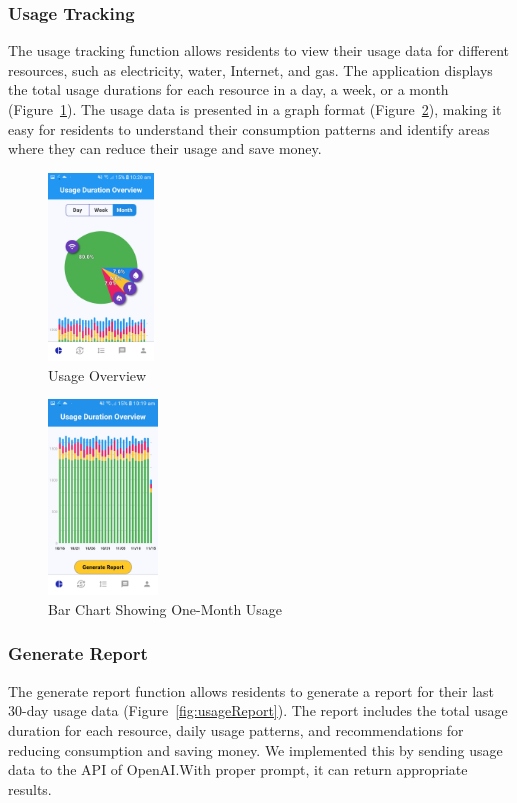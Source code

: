 \documentclass[sigconf,nonacm]{acmart}\settopmatter{printfolios=true}
\begin{document}
\subsubsection{\textbf{Usage Tracking}}
The usage tracking function allows residents to view their usage data for different resources, such as electricity, water, Internet, and gas. The application displays the total usage durations for each resource in a day, a week, or a month (Figure~\ref{fig:usageOverview}). The usage data is presented in a graph format (Figure~\ref{fig:barChart}), making it easy for residents to understand their consumption patterns and identify areas where they can reduce their usage and save money.

\begin{figure}[htbp]
  \centering
  \includegraphics[width=0.25\textwidth]{pieChartOverview.jpg}
  \caption{Usage Overview}
  \label{fig:usageOverview}
\end{figure}
\begin{figure}[htbp]
  \centering
  \includegraphics[width=0.26\textwidth]{30DayBarChart.jpg}
  \caption{Bar Chart Showing One-Month Usage}
  \label{fig:barChart}
\end{figure}

\subsubsection{\textbf{Generate Report}}
The generate report function allows residents to generate a report for their last 30-day usage data (Figure~\ref{fig:usageReport}). The report includes the total usage duration for each resource, daily usage patterns, and recommendations for reducing consumption and saving money. We implemented this by sending usage data to the API of OpenAI.\@ With proper prompt, it can return appropriate results.
\end{document}
